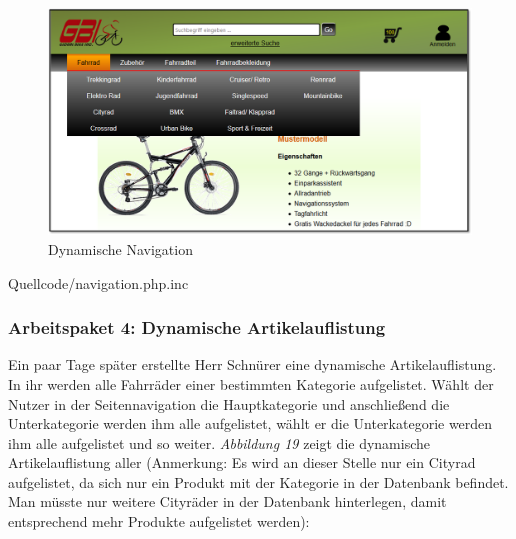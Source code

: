 \vfill

\begin{figure}[H]
\begin{center}
\includegraphics[width=12cm]{Bilder/Abbildung9-DynamischeNaviagtionDesWebshops.png}
\end{center}
\caption{Dynamische Navigation}
\label{Abbildung9-Dynamische Navigation}
\end{figure}

\vfill

\newpage
\begin{center}
	\begin{lstinputlisting}[language=PHP, caption={Auszug aus der Klasse Navigation - Die dynamische Seitennavigation}]
		{Quellcode/navigation.php.inc}
	\end{lstinputlisting}
\end{center}

\newpage
\subsubsection{Arbeitspaket 4: Dynamische Artikelauflistung}

Ein paar Tage später erstellte Herr Schnürer eine dynamische Artikelauflistung. In ihr werden alle Fahrräder einer bestimmten Kategorie aufgelistet. Wählt der Nutzer in der Seitennavigation die Hauptkategorie \grqq{} und anschließend die Unterkategorie \grqq{} werden ihm alle \grqq{} aufgelistet, wählt er die Unterkategorie \grqq{} werden ihm alle \grqq{} aufgelistet und so weiter. \textit{Abbildung 19} zeigt die dynamische Artikelauflistung aller \grqq{} (Anmerkung: Es wird an dieser Stelle nur ein Cityrad aufgelistet, da sich nur ein Produkt mit der Kategorie \grqq{} in der Datenbank befindet. Man müsste nur weitere Cityräder in der Datenbank hinterlegen, damit entsprechend mehr Produkte aufgelistet werden):

